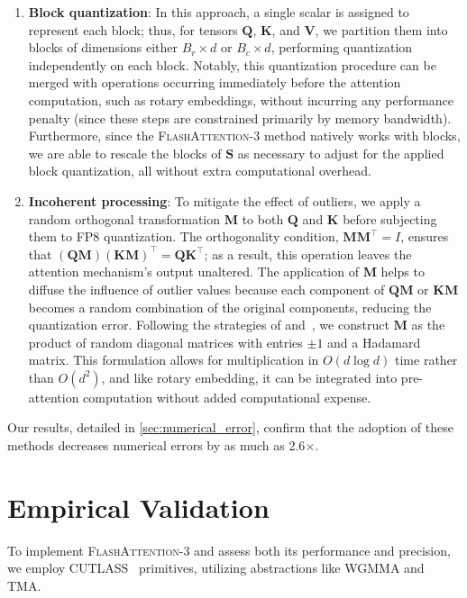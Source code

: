 \begin{algorithm}[H]
\begin{algorithmic}[1]
\begin{enumerate}
\item \textbf{Block quantization}: In this approach, a single scalar is assigned to represent each block; thus, for tensors $\mathbf{Q}$, $\mathbf{K}$, and $\mathbf{V}$, we partition them into blocks of dimensions either $B_r \times d$ or $B_c \times d$, performing quantization independently on each block. Notably, this quantization procedure can be merged with operations occurring immediately before the attention computation, such as rotary embeddings, without incurring any performance penalty (since these steps are constrained primarily by memory bandwidth). Furthermore, since the \textsc{FlashAttention-3} method natively works with blocks, we are able to rescale the blocks of $\mathbf{S}$ as necessary to adjust for the applied block quantization, all without extra computational overhead.

\item \textbf{Incoherent processing}: To mitigate the effect of outliers, we apply a random orthogonal transformation $\mathbf{M}$ to both $\mathbf{Q}$ and $\mathbf{K}$ before subjecting them to FP8 quantization. The orthogonality condition, $\mathbf{M} \mathbf{M}^\top = I$, ensures that $(\mathbf{Q} \mathbf{M})(\mathbf{K} \mathbf{M})^\top = \mathbf{Q} \mathbf{K}^\top$; as a result, this operation leaves the attention mechanism's output unaltered. The application of $\mathbf{M}$ helps to diffuse the influence of outlier values because each component of $\mathbf{Q} \mathbf{M}$ or $\mathbf{K} \mathbf{M}$ becomes a random combination of the original components, reducing the quantization error. Following the strategies of \citet{chee2024quip} and~\citet{tseng2024quip}, we construct $\mathbf{M}$ as the product of random diagonal matrices with entries $\pm1$ and a Hadamard matrix. This formulation allows for multiplication in $O(d \log d)$ time rather than $O(d^2)$, and like rotary embedding, it can be integrated into pre-attention computation without added computational expense.
\end{enumerate}

Our results, detailed in \cref{sec:numerical_error}, confirm that the adoption of these methods decreases numerical errors by as much as 2.6$\times$.

\section{Empirical Validation}
\label{sec:exp}

To implement \textsc{FlashAttention-3} and assess both its performance and precision, we employ CUTLASS~\citep{Thakkar_CUTLASS_2023} primitives, utilizing abstractions like WGMMA and TMA.


\end{algorithmic}
\end{algorithm}
